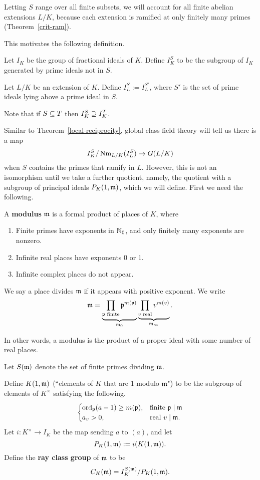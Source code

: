 Letting $S$ range over all finite subsets, we will account for all finite abelian extensions $L/K$, because each extension is ramified at only finitely many primes (Theorem~\ref{crit-ram}).

This motivates the following definition.
\begin{df}
Let $I_K$ be the group of fractional ideals of $K$. Define $I_K^S$ to be the subgroup of $I_K$ generated by prime ideals not in $S$.

Let $L/K$ be an extension of $K$. Define $I_L^S:=I_L^{S'}$, where $S'$ is the set of prime ideals lying above a prime ideal in $S$.
\end{df}
Note that if $S\subseteq T$ then $I_K^S\supseteq I_K^T$.

Similar to Theorem~\ref{local-reciprocity}, global class field theory will tell us there is a map \[I_K^S/\operatorname{Nm}_{L/K}(I^S_L)\to G(L/K)\] when $S$ contains the primes that ramify in $L$. However, this is not an isomorphism until we take a further quotient, namely, the quotient with a subgroup of principal ideals $P_K(1,\mathfrak{m})$, which we will define. First we need the following.
\begin{df}
A \textbf{modulus} $\mathfrak{m}$ is a formal product of places of $K$, where
\begin{enumerate}
\item
Finite primes have exponents in $\mathbb{N}_0$, and only finitely many exponents are nonzero.
\item
Infinite real places have exponents 0 or 1.
\item
Infinite complex places do not appear.
\end{enumerate}
We say a place divides $\mathfrak{m}$ if it appears with positive exponent. We write
\[
\mathfrak{m}=\underbrace{\prod_{\mathfrak{p} \text{ finite}} \mathfrak{p}^{m(\mathfrak{p})}}_{\mathfrak{m}_0}
\underbrace{
\prod_{v\text{ real}} v^{m(v)}
}_{\mathfrak{m}_{\infty}}.
\]
\end{df}
In other words, a modulus is the product of a proper ideal with some number of real places.
\begin{df}
Let $S(\mathfrak{m})$ denote the set of finite primes dividing $\mathfrak{m}$.

Define $K(1,{\mathfrak{m}})$ (``elements of $K$ that are 1 modulo $\mathfrak{m}$") to be the subgroup of elements of $K^{\times}$ satisfying the following.%
\[
\begin{cases}
\operatorname{ord}_{\mathfrak{p}}(a-1)\ge m(\mathfrak{p}),&\text{finite }\mathfrak{p}\mid \mathfrak{m}\\
a_v>0,&\text{real }v\mid \mathfrak{m}.
\end{cases}
\]
Let $i:K^{\times}\to I_K$ be the map sending $a$ to $(a)$, and let 
\[
P_K(1,{\mathfrak{m}}):=i(K(1,{\mathfrak{m}})).
\]
Define the \textbf{ray class group} of $\mathfrak{m}$ to be
\[
C_K(\mathfrak{m})=I_K^{S(\mathfrak{m})}/P_K(1,{\mathfrak{m}}).
\]
\end{df}
